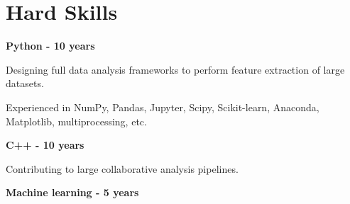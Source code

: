 \documentclass[12pt]{article}
\begin{document}
\section*{Hard Skills}

\textbf{\hspace*{0.2cm}Python - 10 years}
\begin{newitemize2}
\item Designing full data analysis frameworks to perform feature extraction of large datasets.
\item Experienced in NumPy, Pandas, Jupyter, Scipy, Scikit-learn, Anaconda, Matplotlib, multiprocessing, etc.\\
\end{newitemize2}
\textbf{\hspace*{0.2cm}C++ - 10 years}
\begin{newitemize2}
\item Contributing to large collaborative analysis pipelines.\\
\end{newitemize2}
\textbf{\hspace*{0.2cm}Machine learning - 5 years}
\end{document}

